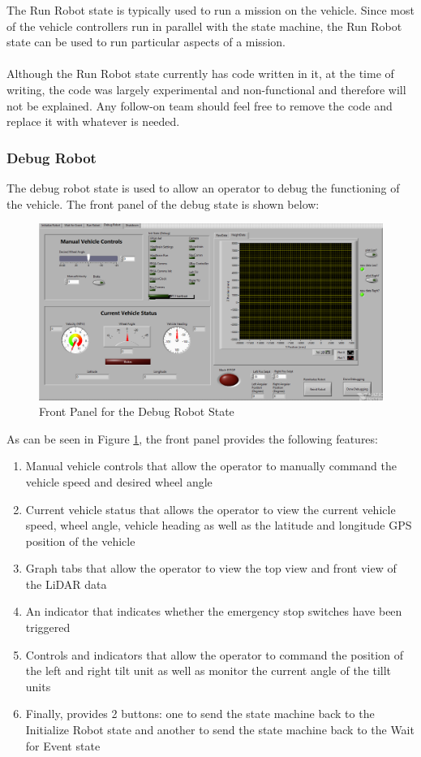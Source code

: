 The Run Robot state is typically used to run a mission on the vehicle. Since most of the vehicle controllers run in parallel with the state machine, the Run Robot state can be used to run particular aspects of a mission. \\ \\
%
Although the Run Robot state currently has code written in it, at the time of writing, the code was largely experimental and non-functional and therefore will not be explained. Any follow-on team should feel free to remove the code and replace it with whatever is needed. 

\subsubsection{Debug Robot}

The debug robot state is used to allow an operator to debug the functioning of the vehicle. The front panel of the debug state is shown below:

\newpage

\begin{figure}[h!]
\centering
\includegraphics[scale=0.4]{Photos/debugrobot.png}
\caption{Front Panel for the Debug Robot State}
\label{fig:debugrobot}
\end{figure}

\noindent As can be seen in Figure \ref{fig:debugrobot}, the front panel provides the following features:

\begin{enumerate}
\item Manual vehicle controls that allow the operator to manually command the vehicle speed and desired wheel angle
\item Current vehicle status that allows the operator to view the current vehicle speed, wheel angle, vehicle heading as well as the latitude and longitude GPS position of the vehicle
\item Graph tabs that allow the operator to view the top view and front view of the LiDAR data
\item An indicator that indicates whether the emergency stop switches have been triggered
\item Controls and indicators that allow the operator to command the position of the left and right tilt unit as well as monitor the current angle of the tillt units
\item Finally, provides 2 buttons: one to send the state machine back to the Initialize Robot state and another to send the state machine back to the Wait for Event state
\end{enumerate}

